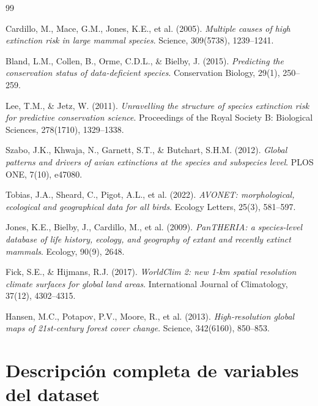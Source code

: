 \documentclass[12pt,a4paper]{article}
\begin{document}
\newpage
\begin{thebibliography}{99}

Cardillo, M., Mace, G.M., Jones, K.E., et al. (2005).
\textit{Multiple causes of high extinction risk in large mammal species}.
Science, 309(5738), 1239--1241.

Bland, L.M., Collen, B., Orme, C.D.L., \& Bielby, J. (2015).
\textit{Predicting the conservation status of data-deficient species}.
Conservation Biology, 29(1), 250--259.

Lee, T.M., \& Jetz, W. (2011).
\textit{Unravelling the structure of species extinction risk for predictive conservation science}.
Proceedings of the Royal Society B: Biological Sciences, 278(1710), 1329--1338.

Szabo, J.K., Khwaja, N., Garnett, S.T., \& Butchart, S.H.M. (2012).
\textit{Global patterns and drivers of avian extinctions at the species and subspecies level}.
PLOS ONE, 7(10), e47080.

Tobias, J.A., Sheard, C., Pigot, A.L., et al. (2022).
\textit{AVONET: morphological, ecological and geographical data for all birds}.
Ecology Letters, 25(3), 581--597.

Jones, K.E., Bielby, J., Cardillo, M., et al. (2009).
\textit{PanTHERIA: a species-level database of life history, ecology, and geography of extant and recently extinct mammals}.
Ecology, 90(9), 2648.

Fick, S.E., \& Hijmans, R.J. (2017).
\textit{WorldClim 2: new 1-km spatial resolution climate surfaces for global land areas}.
International Journal of Climatology, 37(12), 4302--4315.

Hansen, M.C., Potapov, P.V., Moore, R., et al. (2013).
\textit{High-resolution global maps of 21st-century forest cover change}.
Science, 342(6160), 850--853.

\end{thebibliography}

\newpage
\appendix

\section{Descripción completa de variables del dataset}
\label{anx:features}
\end{document}
